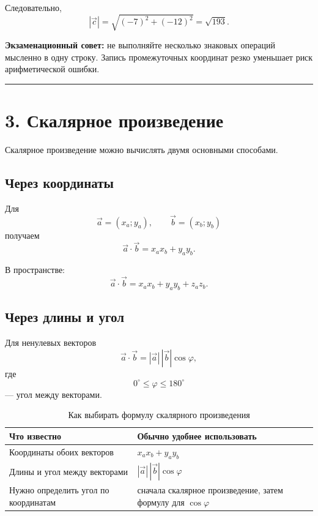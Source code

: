 \documentclass[a4paper,12pt]{article}
\newcommand{\vct}[1]{\vec{#1}}
\newcommand{\sectionline}{%
    \par\noindent
    {\color{linegray}\rule{\linewidth}{0.5pt}}
    \par
}
\begin{document}
Следовательно,
\[
|\vct c|
=
\sqrt{(-7)^2+(-12)^2}
=
\boxed{\sqrt{193}}.
\]

\textbf{Экзаменационный совет:}
не выполняйте несколько знаковых операций мысленно в одну строку.
Запись промежуточных координат резко уменьшает риск арифметической ошибки.

\sectionline

\section*{\color{darkaccent}3. Скалярное произведение}

Скалярное произведение можно вычислять двумя основными способами.

\subsection*{\color{accent}Через координаты}

Для
\[
\vct a=(x_a;y_a),
\qquad
\vct b=(x_b;y_b)
\]
получаем
\[
\boxed{
\vct a\cdot\vct b=x_ax_b+y_ay_b
}.
\]

В пространстве:
\[
\boxed{
\vct a\cdot\vct b=x_ax_b+y_ay_b+z_az_b
}.
\]

\subsection*{\color{accent}Через длины и угол}

Для ненулевых векторов
\[
\boxed{
\vct a\cdot\vct b
=
|\vct a|\,|\vct b|\cos\varphi
},
\]
где
\[
0^\circ\le\varphi\le180^\circ
\]
--- угол между векторами.

\begin{table}[h]
\centering
\caption{Как выбирать формулу скалярного произведения}
\begin{tabularx}{\linewidth}{@{}lX@{}}
\toprule
\textbf{Что известно} & \textbf{Обычно удобнее использовать} \\
\midrule
Координаты обоих векторов &
$x_ax_b+y_ay_b$ \\

Длины и угол между векторами &
$|\vct a|\,|\vct b|\cos\varphi$ \\

Нужно определить угол по координатам &
сначала скалярное произведение, затем формулу для $\cos\varphi$ \\
\bottomrule
\end{tabularx}
\end{table}
\end{document}
